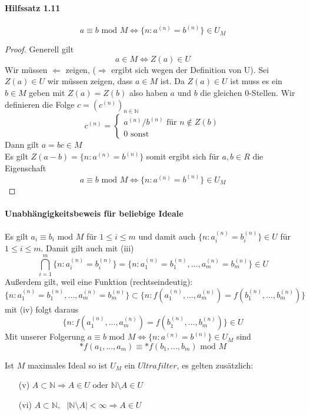 \documentclass[a4paper]{article}
\begin{document}
\paragraph{Hilfssatz 1.11}  
            $$ a \equiv b \text{ mod } M \iff \{n: a^{(n)} = b^{(n)}\} \in U_M $$
\begin{proof}
      Generell gilt  $$ a \in M \iff Z(a) \in U $$ 
      Wir müssen $ \Leftarrow $ zeigen, ($ \Rightarrow $ ergibt sich wegen der Definition von U).
      Sei $ Z(a) \in U $ wir müssen zeigen, dass $ a \in M $ ist.
      Da $ Z(a) \in U $ ist muss es ein $ b \in M $ geben mit $ Z(a) = Z(b) $ also haben $ a $ und $ b $ 
      die gleichen 0-Stellen. Wir definieren die Folge $ c = (c^{(n)})_{n\in \mathbb{N}} $
      $$ 
      c^{(n)} = 
            \begin{cases}
                  a^{(n)} / b^{(n)} \text{ für } n \notin Z(b) \\
                  0  \text{ sonst}   
            \end{cases}
      $$
      Dann gilt $ a = bc \in M $ \\
      Es gilt $ Z(a -b) = \{n: a^{(n)} = b^{(n)}\} $ somit ergibt sich für $ a,b \in R $ die Eigenschaft
      $$ a \equiv b \text{ mod } M \iff \{n: a^{(n)} = b^{(n)}\} \in U_M $$
\end{proof}

\paragraph{Unabhängigkeitsbeweis für beliebige Ideale}
Es gilt $ a_i \equiv b_i \text{ mod } M $ für $ 1 \leqslant i \leqslant m $ und damit auch $ \{n: a^{(n)}_i = b^{(n)}_i\} \in U $ für 
$ 1 \leqslant i \leqslant m $. Damit gilt auch mit (iii)
$$ \bigcap_{i = 1}^m \{n: a^{(n)}_i = b^{(n)}_i\} = \{n: a^{(n)}_1 = b^{(n)}_1,...,a^{(n)}_m = b^{(n)}_m\} \in U $$
Außerdem gilt, weil eine Funktion (rechtseindeutig): 
$$ \{n: a^{(n)}_1 = b^{(n)}_1,...,a^{(n)}_m = b^{(n)}_m\} \subset \{n: f(a^{(n)}_1,...,a^{(n)}_m) = f(b^{(n)}_1,...,b^{(n)}_m)\} $$
mit (iv) folgt daraus
$$ \{n: f(a^{(n)}_1,...,a^{(n)}_m) = f(b^{(n)}_1,...,b^{(n)}_m)\} \in U $$ 
Mit unserer Folgerung $a \equiv b \text{ mod } M \iff \{n: a^{(n)} = b^{(n)}\} \in U_M$ sind 
$$ \text{*}f(a_1,...,a_m) \equiv \text{*}f(b_1,...,b_m) \text{ mod } M $$ 


\newpage
Ist $ M $ maximales Ideal so ist $ U_M $ ein $ Ultrafilter $, es gelten zusätzlich: 
\begin{enumerate}
      \item[(v)] $ A \subset  \mathbb{N} \Rightarrow A \in U \text{ oder } \mathbb{N} \setminus A \in U$ 
      \item[(vi)] $ A \subset  \mathbb{N}, \text{ } |\mathbb{N} \setminus A| < \infty \Rightarrow A \in U$ 
\end{enumerate}
\end{document}

